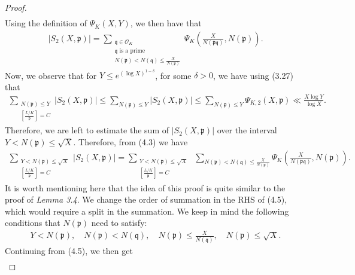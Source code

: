 \documentclass[10pt,a4paper]{amsart}
\begin{document}
\begin{proof}
\begin{align}
        \end{align}
    Using the definition of $\Psi_K(X,Y)$, we then have that 
    \begin{align}
        |S_2(X,\mathfrak{p})| = \sum_{\substack{\mathfrak{q} \in \mathcal{O}_K \\ \mathfrak{q} \text{ is a prime} \\N(\mathfrak{p})<N(\mathfrak{q})\leq \frac{X}{N(\mathfrak{p})}}} \Psi_K\left(\frac{X}{N(\mathfrak{pq})},N(\mathfrak{p})\right).
    \end{align} 
    Now, we observe that for $Y \leq e^{(\log X)^{1-\delta}}$, for some $\delta  >0$, we have using (3.27) that
    \begin{align}
        \sum_{\substack{N(\mathfrak{p}) \leq Y \\ \left[\frac{L/K}{\mathfrak{p}}\right] =C}} |S_2(X,\mathfrak{p})| \leq \sum_{N(\mathfrak{p}) \leq Y} |S_2(X,\mathfrak{p})| \leq   \sum_{N(\mathfrak{p})\leq Y} \Psi_{K,2}\left({X},\mathfrak{p}\right) \ll \frac{X\log Y}{\log X}.
    \end{align}
        Therefore, we are left to estimate the sum of $|S_2(X,\mathfrak{p})|$ over the interval $Y<N(\mathfrak{p})\leq \sqrt{X}$. Therefore, from (4.3) we have
        \begin{align}
            \sum_{\substack{Y<N(\mathfrak{p}) \leq \sqrt{X} \\ \left[\frac{L/K}{\mathfrak{p}}\right] =C}} |S_2(X,\mathfrak{p})| = \sum_{\substack{Y<N(\mathfrak{p}) \leq \sqrt{X} \\ \left[\frac{L/K}{\mathfrak{p}}\right] =C}}\; \sum_{N(\mathfrak{p})<N(\mathfrak{q})\leq \frac{X}{N(\mathfrak{p})}} \Psi_K\left(\frac{X}{N(\mathfrak{p}\mathfrak{q})},N(\mathfrak{p})\right).
        \end{align}
        It is worth mentioning here that the idea of this proof is quite similar to the proof of \textit{Lemma 3.4}. We change the order of summation in the RHS of (4.5), which would require a split in the summation. We keep in mind the following conditions that $N(\mathfrak{p})$ need to satisfy:
        \begin{align}
            Y<N(\mathfrak{p}), \quad N(\mathfrak{p})<N(\mathfrak{q}), \quad N(\mathfrak{p})\leq \frac{X}{N(\mathfrak{q})},\quad N(\mathfrak{p}) \leq \sqrt{X} .\nonumber
        \end{align}
        Continuing from (4.5), we then get 
        \begin{align}

\end{align}
\end{proof}
\end{document}
